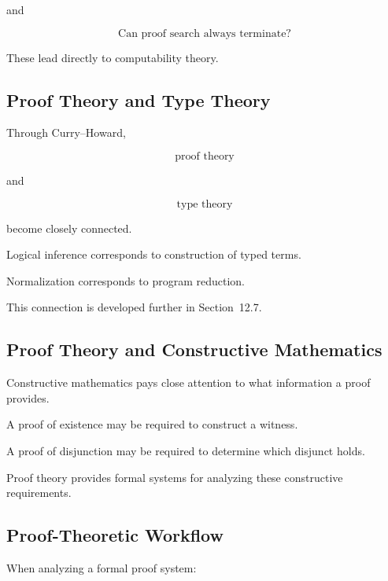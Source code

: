 and

\[
\boxed{
\text{Can proof search always terminate?}
}
\]

These lead directly to computability theory.

\subsection{Proof Theory and Type Theory}
\label{subsec:proof-theory-type-theory}

Through Curry--Howard,

\[
\boxed{
\text{proof theory}
}
\]

and

\[
\boxed{
\text{type theory}
}
\]

become closely connected.

Logical inference corresponds to construction of typed terms.

Normalization corresponds to program reduction.

This connection is developed further in Section~12.7.

\subsection{Proof Theory and Constructive Mathematics}
\label{subsec:proof-theory-constructive-mathematics}

Constructive mathematics pays close attention to what information a proof
provides.

A proof of existence may be required to construct a witness.

A proof of disjunction may be required to determine which disjunct holds.

Proof theory provides formal systems for analyzing these constructive
requirements.

\subsection{Proof-Theoretic Workflow}
\label{subsec:proof-theory-workflow}

When analyzing a formal proof system:

